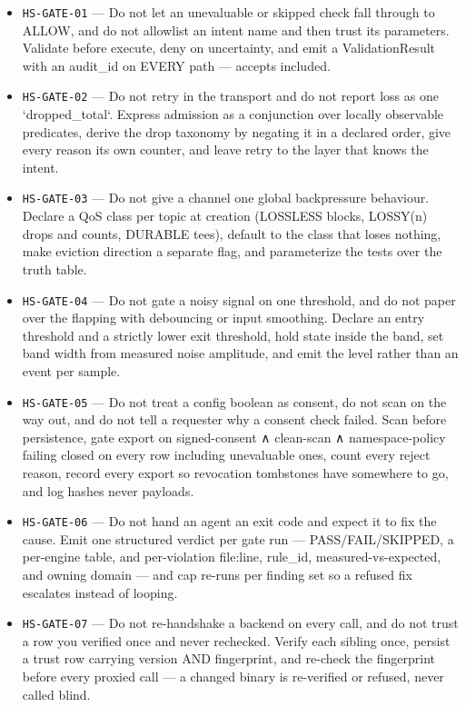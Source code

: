 \documentclass[11pt]{article}
\begin{document}
\begin{itemize}
  \item \texttt{HS-GATE-01} --- Do not let an unevaluable or skipped check fall through to ALLOW, and do not allowlist an intent name and then trust its parameters. Validate before execute, deny on uncertainty, and emit a ValidationResult with an audit\_id on EVERY path — accepts included. %
  \item \texttt{HS-GATE-02} --- Do not retry in the transport and do not report loss as one `dropped\_total`. Express admission as a conjunction over locally observable predicates, derive the drop taxonomy by negating it in a declared order, give every reason its own counter, and leave retry to the layer that knows the intent. %
  \item \texttt{HS-GATE-03} --- Do not give a channel one global backpressure behaviour. Declare a QoS class per topic at creation (LOSSLESS blocks, LOSSY(n) drops and counts, DURABLE tees), default to the class that loses nothing, make eviction direction a separate flag, and parameterize the tests over the truth table. %
  \item \texttt{HS-GATE-04} --- Do not gate a noisy signal on one threshold, and do not paper over the flapping with debouncing or input smoothing. Declare an entry threshold and a strictly lower exit threshold, hold state inside the band, set band width from measured noise amplitude, and emit the level rather than an event per sample. %
  \item \texttt{HS-GATE-05} --- Do not treat a config boolean as consent, do not scan on the way out, and do not tell a requester why a consent check failed. Scan before persistence, gate export on signed-consent ∧ clean-scan ∧ namespace-policy failing closed on every row including unevaluable ones, count every reject reason, record every export so revocation tombstones have somewhere to go, and log hashes never payloads. %
  \item \texttt{HS-GATE-06} --- Do not hand an agent an exit code and expect it to fix the cause. Emit one structured verdict per gate run — PASS/FAIL/SKIPPED, a per-engine table, and per-violation file:line, rule\_id, measured-vs-expected, and owning domain — and cap re-runs per finding set so a refused fix escalates instead of looping. %
  \item \texttt{HS-GATE-07} --- Do not re-handshake a backend on every call, and do not trust a row you verified once and never rechecked. Verify each sibling once, persist a trust row carrying version AND fingerprint, and re-check the fingerprint before every proxied call — a changed binary is re-verified or refused, never called blind. %

\end{itemize}
\end{document}
